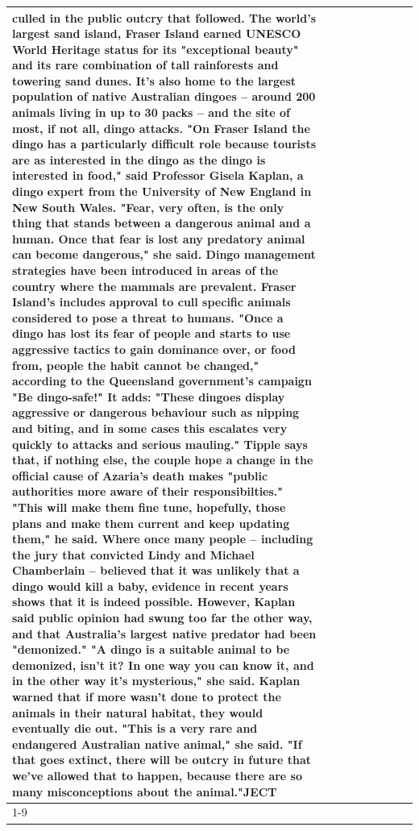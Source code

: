 \begin{table}[H]
\begin{tabular}{lllrlllll}
culled in the public outcry that followed. The world's largest sand island, Fraser Island earned UNESCO World Heritage status for its "exceptional beauty" and its rare combination of tall rainforests and towering sand dunes. It's also home to the largest population of native Australian dingoes -- around 200 animals living in up to 30 packs -- and the site of most, if not all, dingo attacks. "On Fraser Island the dingo has a particularly difficult role because tourists are as interested in the dingo as the dingo is interested in food," said Professor Gisela Kaplan, a dingo expert from the University of New England in New South Wales. "Fear, very often, is the only thing that stands between a dangerous animal and a human. Once that fear is lost any predatory animal can become dangerous," she said. Dingo management strategies have been introduced in areas of the country where the mammals are prevalent. Fraser Island's includes approval to cull specific animals considered to pose a threat to humans. "Once a dingo has lost its fear of people and starts to use aggressive tactics to gain dominance over, or food from, people the habit cannot be changed," according to the Queensland government's campaign "Be dingo-safe!" It adds: "These dingoes display aggressive or dangerous behaviour such as nipping and biting, and in some cases this escalates very quickly to attacks and serious mauling." Tipple says that, if nothing else, the couple hope a change in the official cause of Azaria's death makes "public authorities more aware of their responsibilties." "This will make them fine tune, hopefully, those plans and make them current and keep updating them," he said. Where once many people -- including the jury that convicted Lindy and Michael Chamberlain -- believed that it was unlikely that a dingo would kill a baby, evidence in recent years shows that it is indeed possible. However, Kaplan said public opinion had swung too far the other way, and that Australia's largest native predator had been "demonized." "A dingo is a suitable animal to be demonized, isn't it? In one way you can know it, and in the other way it's mysterious," she said. Kaplan warned that if more wasn't done to protect the animals in their natural habitat, they would eventually die out. "This is a very rare and endangered Australian native animal," she said. "If that goes extinct, there will be outcry in future that we've allowed that to happen, because there are so many misconceptions about the animal."JECT \\
\cline{1-9}

\end{tabular}
\end{table}

